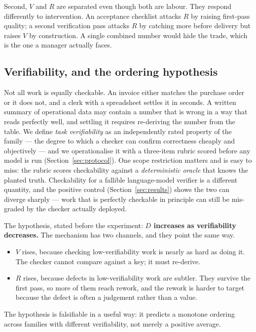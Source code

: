 \documentclass[11pt]{article}
\newcommand{\D}{\ensuremath{D}}
\newcommand{\VV}{\ensuremath{V}}
\newcommand{\RV}{\ensuremath{R}}
\begin{document}
Second, $\VV$ and $\RV$ are separated even though both are labour. They respond differently to
intervention. An acceptance checklist attacks $\RV$ by raising first-pass quality; a second
verification pass attacks $\RV$ by catching more before delivery but raises $\VV$ by construction.
A single combined number would hide the trade, which is the one a manager actually faces.

\subsection{Verifiability, and the ordering hypothesis}

Not all work is equally checkable. An invoice either matches the purchase order or it does not,
and a clerk with a spreadsheet settles it in seconds. A written summary of operational data may
contain a number that is wrong in a way that reads perfectly well, and settling it requires
re-deriving the number from the table. We define \emph{task verifiability} as an independently
rated property of the family --- the degree to which a checker can confirm correctness cheaply and
objectively --- and we operationalise it with a three-item rubric scored before any model is run
(Section~\ref{sec:protocol}). One scope restriction matters and is easy to miss: the rubric scores
checkability against a \emph{deterministic oracle} that knows the planted truth. Checkability for a
fallible language-model verifier is a different quantity, and the positive control
(Section~\ref{sec:results}) shows the two can diverge sharply --- work that is perfectly checkable
in principle can still be mis-graded by the checker actually deployed.

The hypothesis, stated before the experiment: \textbf{$\D$ increases as verifiability decreases.}
The mechanism has two channels, and they point the same way.
\begin{itemize}
\item $\VV$ rises, because checking low-verifiability work is nearly as hard as doing it. The
checker cannot compare against a key; it must re-derive.
\item $\RV$ rises, because defects in low-verifiability work are subtler. They survive the first
pass, so more of them reach rework, and the rework is harder to target because the defect is
often a judgement rather than a value.
\end{itemize}
The hypothesis is falsifiable in a useful way: it predicts a monotone ordering across families
with different verifiability, not merely a positive average.
\end{document}
